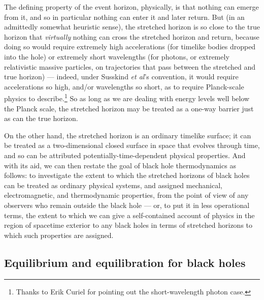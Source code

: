 \documentclass[12pt]{article}
\begin{document}
The defining property of the event horizon, physically, is that nothing can emerge from it, and so in particular nothing can enter it and later return. But (in an admittedly somewhat heuristic sense), the stretched horizon is so close to the true horizon that \emph{virtually} nothing can cross the stretched horizon and return, because doing so would require extremely high accelerations (for timelike bodies dropped into the hole) or extremely short wavelengths (for photons, or extremely relativistic massive particles, on trajectories that pass between the stretched and true horizon) --- indeed, under Susskind \emph{et al}'s convention, it would require accelerations so high, and/or wavelengths so short, as to require Planck-scale physics to describe.\footnote{Thanks to Erik Curiel for pointing out the short-wavelength photon case.} So as long as we are dealing with energy levels well below the Planck scale, the stretched horizon may be treated as a one-way barrier just as can the true horizon.

On the other hand, the stretched horizon is an ordinary timelike surface; it can be treated as a two-dimensional closed surface in space that evolves through time, and so can be attributed potentially-time-dependent physical properties. And with its aid, we can then restate the goal of black hole thermodynamics as follows: to investigate the extent to which the stretched horizons of black holes can be treated as ordinary physical systems, and assigned mechanical, electromagnetic, and thermodynamic properties, from the point of view of any observers who remain outside the black hole --- or, to put it in less operational terms, the extent to which we can give a self-contained account of physics in the region of spacetime exterior to any black holes in terms of stretched horizons to which such properties are assigned.

\subsection{Equilibrium and equilibration for black holes}\label{blackhole-equilibrium}
\end{document}
